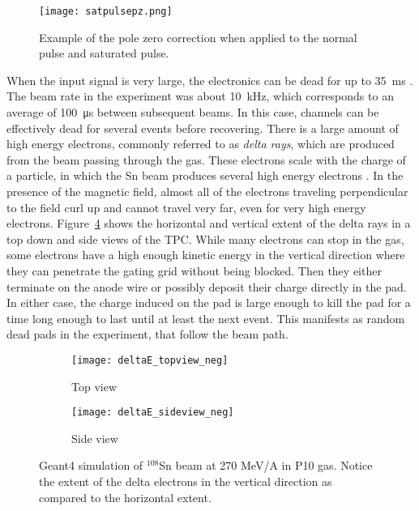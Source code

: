 \begin{figure}[!htb]
\centering
\texttt{[image: satpulsepz.png]} 
\caption{Example of the pole zero correction when applied to the normal pulse and saturated pulse.} 
\label{fig:pulseSatTag}
\end{figure}


When the input signal is very large, the electronics can be dead for up to \SI{35}{\milli\second} \cite{akiGET}. The beam rate in the experiment was about \SI{10}{\kilo\hertz}, which corresponds to an average of \SI{100}{\micro\second} between subsequent beams. In this case, channels can be effectively dead for several events before recovering. There is a large amount of high energy electrons, commonly referred to as \emph{delta rays},  which are produced from the beam passing through the gas. These electrons scale with the charge of a particle, in which the Sn beam produces several high energy electrons \cite{pdg}. In the presence of the magnetic field, almost all of the electrons traveling perpendicular to the field curl up and cannot travel very far, even for very high energy electrons. Figure~\ref{fig:deltaE} shows the horizontal and vertical extent of the delta rays in a top down and side views of the TPC. While many electrons can stop in the gas, some electrons have a high enough kinetic energy in the vertical direction where they can penetrate the gating grid without being blocked. Then they either terminate on the anode wire or possibly deposit their charge directly in the pad. In either case, the charge induced on the pad is large enough to kill the pad for a time long enough to last until at least the next event. This manifests as random dead pads in the experiment, that follow the beam path.  



\begin{figure}[!htb]
    \centering
    \begin{subfigure}[t]{0.49\textwidth}
        \centering
        \texttt{[image: deltaE\_topview\_neg]} 
        \caption{Top view} \label{fig:deltaE_topview}
    \end{subfigure}
    \hfill
    \begin{subfigure}[t]{0.49\textwidth}
        \centering
        \texttt{[image: deltaE\_sideview\_neg]} 
        \caption{Side view} \label{fig:deltaE_sideview}
    \end{subfigure}
    \caption{Geant4 simulation of ${}^{108}$Sn beam at 270 MeV/A in P10 gas. Notice the extent of the delta electrons in the vertical direction as compared to the horizontal extent. }
\label{fig:deltaE}
\end{figure}


